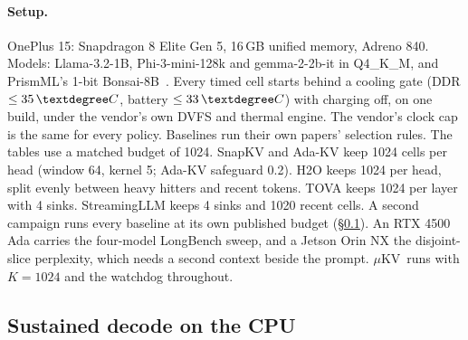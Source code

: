 \documentclass[sigconf, anonymous=false, screen=true]{acmart}
\newcommand{\ub}{\_\allowbreak}
\newcommand{\muKV}{$\mu$KV}
\newcommand{\C}{\,\textdegree C}
\begin{document}
\paragraph{Setup.} OnePlus 15: Snapdragon 8 Elite Gen 5, 16\,GB unified memory, Adreno 840. Models: Llama-3.2-1B, Phi-3-mini-128k and gemma-2-2b-it in Q4\ub K\ub M, and PrismML's 1-bit Bonsai-8B~\cite{prismml2026bonsai}. Every timed cell starts behind a cooling gate (DDR $\le 35\C$, battery $\le 33\C$) with charging off, on one build, under the vendor's own DVFS and thermal engine. The vendor's clock cap is the same for every policy. Baselines run their own papers' selection rules. The tables use a matched budget of 1024. SnapKV and Ada-KV keep 1024 cells per head (window 64, kernel 5; Ada-KV safeguard 0.2). H2O keeps 1024 per head, split evenly between heavy hitters and recent tokens. TOVA keeps 1024 per layer with 4 sinks. StreamingLLM keeps 4 sinks and 1020 recent cells. A second campaign runs every baseline at its own published budget (\S\ref{sec:eval-cpu}). An RTX 4500 Ada carries the four-model LongBench sweep, and a Jetson Orin NX the disjoint-slice perplexity, which needs a second context beside the prompt. \muKV\ runs with $K{=}1024$ and the watchdog throughout.

\subsection{Sustained decode on the CPU}
\label{sec:eval-cpu}
\end{document}
